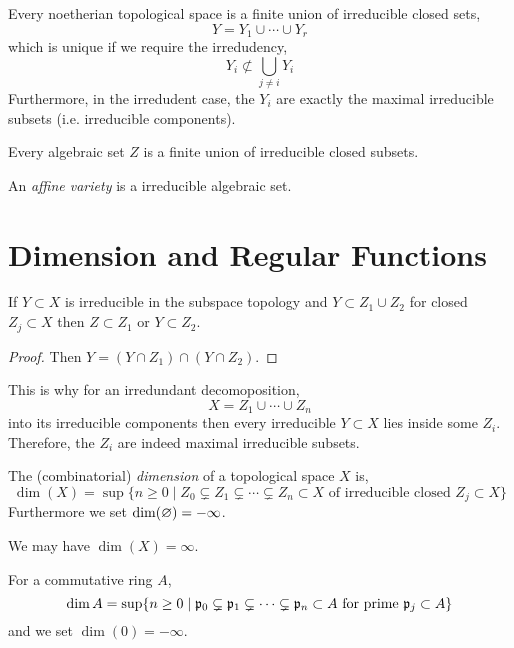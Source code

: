 \documentclass[12pt]{article}
\begin{document}
\begin{thm}
Every noetherian topological space is a finite union of irreducible closed sets,
\[ Y = Y_1 \cup \cdots \cup Y_r \]
which is unique if we require the irredudency,
\[ Y_i \not\subset \bigcup_{j \neq i} Y_i \]
Furthermore, in the irredudent case, the $Y_i$ are exactly the maximal irreducible subsets (i.e. irreducible components). 
\end{thm}

\begin{cor}
Every algebraic set $Z$ is a finite union of irreducible closed subsets.
\end{cor}

\begin{defn}
An \textit{affine variety} is a irreducible algebraic set.
\end{defn}

\section{Dimension and Regular Functions}

\begin{lemma}
If $Y \subset X$ is irreducible in the subspace topology and $Y \subset Z_1 \cup Z_2$ for closed $Z_j \subset X$ then $Z \subset Z_1$ or $Y \subset Z_2$.
\end{lemma}

\begin{proof}
Then $Y = (Y \cap Z_1) \cap (Y \cap Z_2)$.
\end{proof}

\begin{rmk}
This is why for an irredundant decomoposition,
\[ X = Z_1 \cup \cdots \cup Z_n \]
into its irreducible components then every irreducible $Y \subset X$ lies inside some $Z_i$. Therefore, the $Z_i$ are indeed maximal irreducible subsets.
\end{rmk}

\begin{defn}
The (combinatorial) \textit{dimension} of a topological space $X$ is,
\[ \dim(X) = \sup \{ n \ge 0 \mid Z_0 \subsetneq Z_1 \subsetneq \cdots \subsetneq Z_n \subset X \text{ of irreducible closed } Z_j \subset X \} \]
Furthermore we set $\dim(\varnothing) = -\infty$.
\end{defn}

\begin{rmk}
We may have $\dim(X) = \infty$.
\end{rmk}

\begin{defn}
For a commutative ring $A$,
\[ \dim{A} = \sup\{ n \ge 0 \mid \mathfrak{p}_0 \subsetneq \mathfrak{p}_1 \subsetneq \cdots \subsetneq \mathfrak{p}_n \subset A \text{ for prime } \mathfrak{p}_j \subset A \} \]
and we set $\dim{(0)} = - \infty$.
\end{defn}
\end{document}
